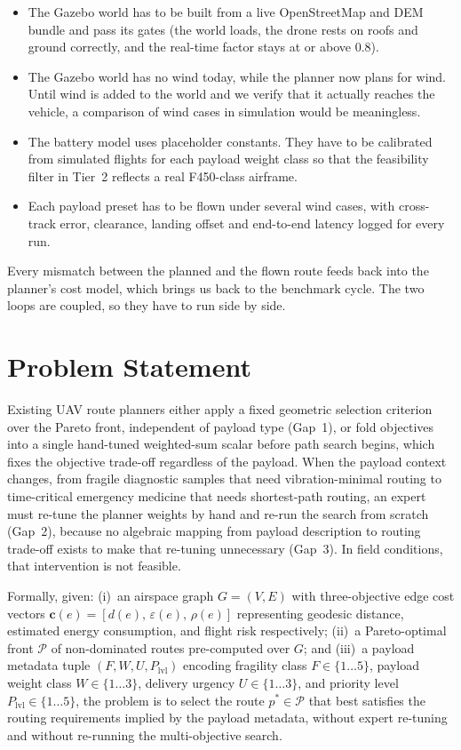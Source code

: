 \documentclass{ssnreview}
\newcommand{\flowchapter}[1]{\par\addvspace{30pt}\let\origclearpage\clearpage\let\clearpage\relax\chapter{#1}\let\clearpage\origclearpage}  %
\begin{document}
\begin{itemize}
  \item The Gazebo world \cite{r24} has to be built from a live OpenStreetMap and DEM
  bundle and pass its gates (the world loads, the drone rests on roofs and ground
  correctly, and the real-time factor stays at or above 0.8).
  \item The Gazebo world has no wind today, while the planner now plans for wind. Until
  wind is added to the world and we verify that it actually reaches the vehicle, a
  comparison of wind cases in simulation would be meaningless.
  \item The battery model uses placeholder constants. They have to be calibrated from
  simulated flights for each payload weight class so that the feasibility filter in
  Tier~2 reflects a real F450-class airframe.
  \item Each payload preset has to be flown under several wind cases, with cross-track
  error, clearance, landing offset and end-to-end latency logged for every run.
\end{itemize}

Every mismatch between the planned and the flown route feeds back into the planner's
cost model, which brings us back to the benchmark cycle. The two loops are coupled, so
they have to run side by side.



\flowchapter{Problem Statement}\label{cha:problem}

Existing UAV route planners either apply a fixed geometric selection criterion over the
Pareto front, independent of payload type (Gap~1), or fold objectives into a single
hand-tuned weighted-sum scalar before path search begins, which fixes the objective
trade-off regardless of the payload. When the payload context changes, from fragile
diagnostic samples that need vibration-minimal routing to time-critical emergency
medicine that needs shortest-path routing, an expert must re-tune the planner weights by
hand and re-run the search from scratch (Gap~2), because no algebraic mapping from
payload description to routing trade-off exists to make that re-tuning unnecessary
(Gap~3). In field conditions, that intervention is not feasible.

Formally, given:
(i)~an airspace graph $G = (V, E)$ with three-objective edge cost vectors
$\mathbf{c}(e) = [d(e),\, \varepsilon(e),\, \rho(e)]$ representing geodesic distance,
estimated energy consumption, and flight risk respectively;
(ii)~a Pareto-optimal front $\mathcal{P}$ of non-dominated routes pre-computed over $G$;
and (iii)~a payload metadata tuple $(F, W, U, P_\mathrm{lvl})$ encoding fragility class
$F \in \{1\ldots5\}$, payload weight class $W \in \{1\ldots3\}$, delivery urgency
$U \in \{1\ldots3\}$, and priority level $P_\mathrm{lvl} \in \{1\ldots5\}$, the
problem is to select the route $p^* \in \mathcal{P}$ that best satisfies the routing
requirements implied by the payload metadata, without expert re-tuning and without
re-running the multi-objective search.
\end{document}
